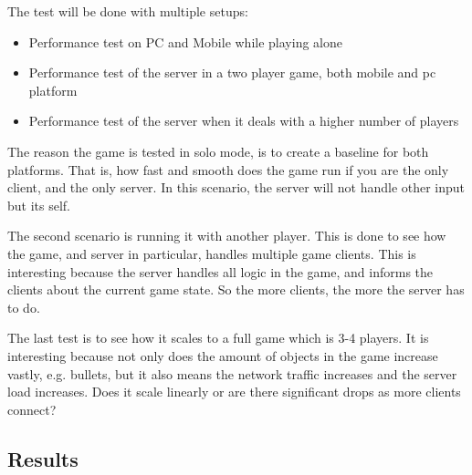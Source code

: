 The test will be done with multiple setups:
\begin{itemize}
\item Performance test on PC and Mobile while playing alone
\item Performance test of the server in a two player game, both mobile and pc platform
\item Performance test of the server when it deals with a higher number of players
\end{itemize}

The reason the game is tested in solo mode, is to create a baseline for both platforms. That is, how fast and smooth does the game run if you are the only client, and the only server. In this scenario, the server will not handle other input but its self.

The second scenario is running it with another player. This is done to see how the game, and server in particular, handles multiple game clients. This is interesting because the server handles all logic in the game, and informs the clients about the current game state. So the more clients, the more the server has to do. 

The last test is to see how it scales to a full game which is 3-4 players. It is interesting because not only does the amount of objects in the game increase vastly, e.g. bullets, but it also means the network traffic increases and the server load increases. Does it scale linearly or are there significant drops as more clients connect?

\subsection{Results}
